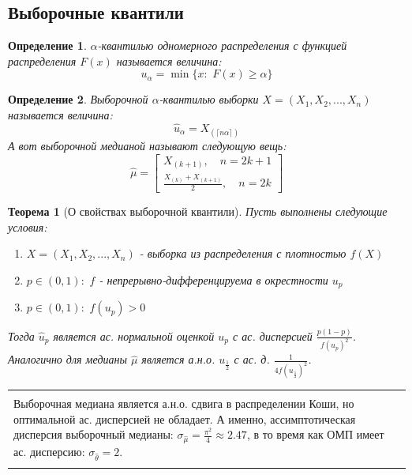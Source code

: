 \documentclass[a4paper,12pt]{article}
\newcommand{\orst}[2]{#1_{(#2)}}
\newcommand{\sample}{X_1, X_2, ..., X_n}
\newenvironment{annotation}{\begin{center}
    \begin{tabular}{|p{0.9\textwidth}|}
    \hline\\
}
{ 
    \\\\\hline
    \end{tabular} 
    \end{center}
}
\newtheorem{dfn}{Определение}[section]
\theoremstyle{named}
\newtheorem*{namedtheorem}{Теорема}
\begin{document}
\subsection{Выборочные квантили}
\begin{dfn}
    $\alpha$-квантилью одномерного распределения с функцией распределения $F(x)$ называется величина:
    $$
        u_\alpha = \min \{x: \,\, F(x) \geq \alpha \} 
    $$
\end{dfn}
\begin{dfn}
    Выборочной $\alpha$-квантилью выборки $X = (\sample)$ называется величина:
    $$
        \hat u_\alpha = \orst{X}{\lceil n\alpha \rceil}
    $$
    А вот выборочной медианой называют следующую вещь:
    $$
        \hat\mu = \begin{bmatrix}
            \orst{X}{k+1}, \quad n = 2k+1 \\ 
            \frac{\orst{X}{k} + \orst{X}{k+1}}{2}, \quad n = 2k
        \end{bmatrix}
    $$
\end{dfn}
\begin{namedtheorem}[О свойствах выборочной квантили]
    Пусть выполнены следующие условия:
    \begin{enumerate}
        \item $X = (\sample)$ - выборка из распределения с плотностью $f(X)$ 
        \item $p \in (0, 1): \,\, f$ - непрерывно-дифференцируема в окрестности $u_p$
        \item $p \in (0, 1): \,\, f(u_p) > 0$ 
    \end{enumerate}
    Тогда $\hat u_p$ является ас. нормальной оценкой $u_p$ с ас. дисперсией $\frac{p(1-p)}{f(u_p)^2}$. 
    Аналогично для медианы $\hat\mu$ является а.н.о. $u_\frac12$ с ас. д. $\frac{1}{4f(u_\frac{1}{2})^2}$.
\end{namedtheorem}
\begin{annotation}
    Выборочная медиана является а.н.о. сдвига в распределении Коши, но оптимальной ас. дисперсией не обладает. А именно, 
    ассимптотическая дисперсия выборочный медианы: $\sigma_{\hat\mu} = \frac{\pi^2}{4} \approx 2.47$, в то время как 
    ОМП имеет ас. дисперсию: $\sigma_{\hat\theta} = 2$. 
\end{annotation}
\end{document}
